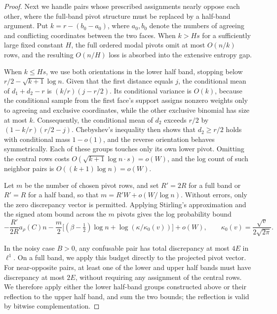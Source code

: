 \begin{proof}
Next we handle pairs whose prescribed assignments nearly oppose each other, where the full-band pivot structure must be replaced by a half-band argument. Put \(k=r-(b_0-a_0)\), where \(a_0,b_0\) denote the numbers of agreeing and conflicting coordinates between the two faces. When \(k>Hs\) for a sufficiently large fixed constant \(H\), the full ordered modal pivots omit at most \(O(n/k)\) rows, and the resulting \(O(n/H)\) loss is absorbed into the extensive entropy gap.

When \(k\le Hs\), we use both orientations in the lower half band, stopping below \(r/2-\sqrt{k+1}\log n\). Given that the first distance equals \(j\), the conditional mean of \(d_1+d_2-r\) is \((k/r)(j-r/2)\). Its conditional variance is \(O(k)\), because the conditional sample from the first face's support assigns nonzero weights only to agreeing and exclusive coordinates, while the other exclusive binomial has size at most \(k\). Consequently, the conditional mean of \(d_2\) exceeds \(r/2\) by \((1-k/r)(r/2-j)\). Chebyshev's inequality then shows that \(d_2\ge r/2\) holds with conditional mass \(1-o(1)\), and the reverse orientation behaves symmetrically. Each of these groups touches only its own lower pivot. Omitting the central rows costs \(O(\sqrt{k+1}\log n\cdot s)=o(W)\), and the log count of such neighbor pairs is \(O((k+1)\log n)=o(W)\).

Let \(m\) be the number of chosen pivot rows, and set \(R'=2R\) for a full band or \(R'=R\) for a half band, so that \(m=R'W+o(W/\log n)\). Without errors, only the zero discrepancy vector is permitted. Applying Stirling's approximation and the signed atom bound across the \(m\) pivots gives the log probability bound
\[
 -\frac{R'}{2R} a_\rho(C)n
 -\frac m2\big[(\beta-\tfrac12)\log n+
                      \log(\kappa/\kappa_0(v))\big]+o(W),
 \qquad \kappa_0(v)=\frac{\sqrt v}{2\sqrt{2\pi}} .
\]

In the noisy case \(B>0\), any confusable pair has total discrepancy at most \(4E\) in \(\ell^1\). On a full band, we apply this budget directly to the projected pivot vector. For near-opposite pairs, at least one of the lower and upper half bands must have discrepancy at most \(2E\), without requiring any assignment of the central rows. We therefore apply either the lower half-band groups constructed above or their reflection to the upper half band, and sum the two bounds; the reflection is valid by bitwise complementation.


\end{proof}
